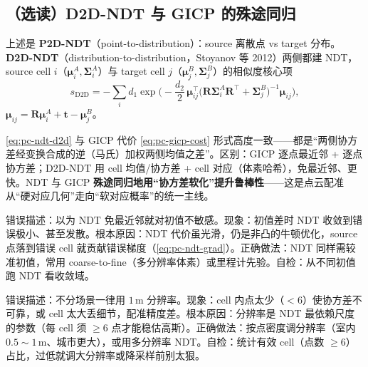 \subsection{（选读）D2D-NDT 与 GICP 的殊途同归}
\label{sec:pc-ndt-d2d}

上述是 \textbf{P2D-NDT}（point-to-distribution）：source 离散点 vs target 分布。\textbf{D2D-NDT}（distribution-to-distribution，Stoyanov 等 2012）两侧都建 NDT，source cell $i$（$\boldsymbol{\mu}_i^A,\boldsymbol{\Sigma}_i^A$）与 target cell $j$（$\boldsymbol{\mu}_j^B,\boldsymbol{\Sigma}_j^B$）的相似度核心项
\begin{equation}
  s_{\text{D2D}}=-\sum_{i}d_1\exp\!\Big(-\frac{d_2}{2}\,\boldsymbol{\mu}_{ij}^\top\big(\mathbf{R}\boldsymbol{\Sigma}_i^A\mathbf{R}^\top+\boldsymbol{\Sigma}_j^B\big)^{-1}\boldsymbol{\mu}_{ij}\Big),
  \label{eq:pc-ndt-d2d}
\end{equation}
$\boldsymbol{\mu}_{ij}=\mathbf{R}\boldsymbol{\mu}_i^A+\mathbf{t}-\boldsymbol{\mu}_j^B$。

\begin{insight}
\cref{eq:pc-ndt-d2d} 与 GICP 代价 \cref{eq:pc-gicp-cost} 形式高度一致——都是“两侧协方差经变换合成的逆（马氏）加权两侧均值之差”。区别：GICP 逐点最近邻 + 逐点协方差；D2D-NDT 用 cell 均值/协方差 + cell 对应（体素哈希），免最近邻、更快。NDT 与 GICP \textbf{殊途同归地用“协方差软化”提升鲁棒性}——这是点云配准从“硬对应几何”走向“软对应概率”的统一主线。
\end{insight}

\begin{pitfall}
错误描述：以为 NDT 免最近邻就对初值不敏感。现象：初值差时 NDT 收敛到错误极小、甚至发散。根本原因：NDT 代价虽光滑，仍是非凸的牛顿优化，source 点落到错误 cell 就贡献错误梯度（\cref{eq:pc-ndt-grad}）。正确做法：NDT 同样需较准初值，常用 coarse-to-fine（多分辨率体素）或里程计先验。自检：从不同初值跑 NDT 看收敛域。
\end{pitfall}

\begin{pitfall}
错误描述：不分场景一律用 $1\,\mathrm{m}$ 分辨率。现象：cell 内点太少（$<6$）使协方差不可靠，或 cell 太大丢细节，配准精度差。根本原因：分辨率是 NDT 最依赖尺度的参数（每 cell 须 $\ge6$ 点才能稳估高斯）。正确做法：按点密度调分辨率（室内 $0.5\sim1\,\mathrm{m}$、城市更大），或用多分辨率 NDT。自检：统计有效 cell（点数 $\ge6$）占比，过低就调大分辨率或降采样前别太狠。
\end{pitfall}


